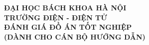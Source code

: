 %
%


\newcommand{\evalheaderfont}{\footnotesize}
\newcommand{\evalcolhead}{%
  \rowcolor{LightCyan}
  \textbf{STT} & \textbf{Tiêu chí (Điểm tối đa)} &
  \textbf{Hướng dẫn đánh giá tiêu chí} & \textbf{Điểm tiêu chí}\\
}

\begingroup
\singlespacing
\setlength{\extrarowheight}{1pt}\setlength{\tabcolsep}{4pt}
\evalheaderfont

\thispagestyle{fancy}
\begin{center}
  {\bfseries ĐẠI HỌC BÁCH KHOA HÀ NỘI}\\[2pt]
  {\bfseries TRƯỜNG ĐIỆN - ĐIỆN TỬ}\\[4pt]
  {\large\bfseries ĐÁNH GIÁ ĐỒ ÁN TỐT NGHIỆP}\\[2pt]
  {\bfseries (DÀNH CHO CÁN BỘ HƯỚNG DẪN)}
\end{center}

